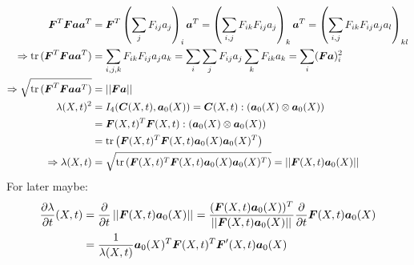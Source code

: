 \begin{align*}
	\vF^T\vF\va\va^T &= \vF^T\left(\sum_j F_{ij}a_j\right)_i\va^T = \left(\sum_{i,j} F_{ik}F_{ij}a_j\right)_k\va^T
		= \left(\sum_{i,j} F_{ik}F_{ij}a_ja_l\right)_{kl}\\
	\Rightarrow \tr{(\vF^T\vF\va\va^T)} &= \sum_{i,j,k} F_{ik}F_{ij}a_ja_k = \sum_i \sum_jF_{ij}a_j \sum_k F_{ik}a_k = \sum_i (\vF\va)_i^2\\
	\Rightarrow \sqrt{\tr{(\vF^T\vF\va\va^T)}} &= \no{\vF\va}\\
	\la(X,t)^2 &=I_4(\vC(X,t),\va_0(X)) = \vC(X,t):(\va_0(X)\otimes \va_0(X))\\
			&=  \vF(X,t)^T\vF(X,t) : (\va_0(X)\otimes \va_0(X))\\
			&= \tr{\left(\vF(X,t)^T\vF(X,t)\va_0(X)\va_0(X)^T\right)}\\
	\Rightarrow \la(X,t) &=
			\sqrt{\tr{\left(\vF(X,t)^T\vF(X,t)\va_0(X)\va_0(X)^T\right)}} = \no{\vF(X,t)\va_0(X)} 
\end{align*}
For later maybe:
\begin{align*}
	\d{\la}{t}(X,t) &= \d{}{t}\no{\vF(X,t)\va_0(X)} = \frac{(\vF(X,t)\va_0(X))^T}{\no{\vF(X,t)\va_0(X)}}\d{}{t}\vF(X,t)\va_0(X)\\
	  &= \frac{1}{\la(X,t)}\va_0(X)^T\vF(X,t)^T\vF'(X,t)\va_0(X)
\end{align*}

